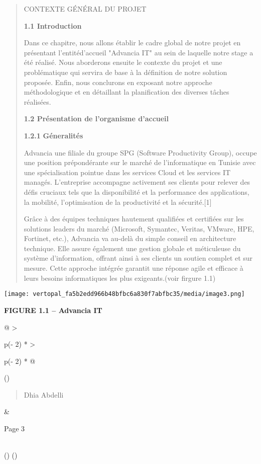 \documentclass[
]{article}
\begin{document}
\begin{quote}
CONTEXTE GÉNÉRAL DU PROJET

\textbf{1.1 Introduction}

Dans ce chapitre, nous allons établir le cadre global de notre projet en
présentant l'entitéd'accueil "Advancia IT" au sein de laquelle notre
stage a été réalisé. Nous aborderons ensuite le contexte du projet et
une problématique qui servira de base à la définition de notre solution
proposée. Enfin, nous conclurons en exposant notre approche
méthodologique et en détaillant la planification des diverses tâches
réalisées.

\textbf{1.2 Présentation de l'organisme d'accueil}

\textbf{1.2.1} \textbf{Géneralités}

Advancia une filiale du groupe SPG (Software Productivity Group), occupe
une position prépondérante sur le marché de l'informatique en Tunisie
avec une spécialisation pointue dans les services Cloud et les services
IT managés. L'entreprise accompagne activement ses clients pour relever
des défis cruciaux tels que la disponibilité et la performance des
applications, la mobilité, l'optimisation de la productivité et la
sécurité.{[}1{]}

Grâce à des équipes techniques hautement qualifiées et certifiées sur
les solutions leaders du marché (Microsoft, Symantec, Veritas, VMware,
HPE, Fortinet, etc.), Advancia va au-delà du simple conseil en
architecture technique. Elle assure également une gestion globale et
méticuleuse du système d'information, offrant ainsi à ses clients un
soutien complet et sur mesure. Cette approche intégrée garantit une
réponse agile et efficace à leurs besoins informatiques les plus
exigeants.(voir firgure 1.1)
\end{quote}

\texttt{[image: vertopal\_fa5b2edd966b48bfbc6a830f7abfbc35/media/image3.png]}

\textbf{FIGURE 1.1 -- Advancia IT}

\begin{longtable}[]{@{}
  >{\raggedright\arraybackslash}p{(\columnwidth - 2\tabcolsep) * }
  >{\raggedright\arraybackslash}p{(\columnwidth - 2\tabcolsep) * }@{}}
\toprule()
\begin{minipage}[b]{\linewidth}\raggedright
\begin{quote}
Dhia Abdelli
\end{quote}
\end{minipage} & \begin{minipage}[b]{\linewidth}\raggedright
Page 3
\end{minipage} \\
\midrule()
\endhead
\bottomrule()
\end{longtable}
\end{document}
